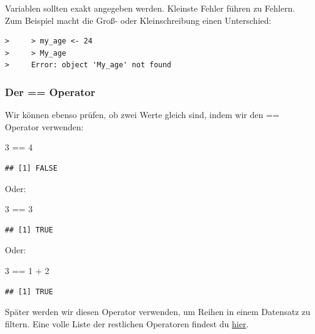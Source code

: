 \documentclass[
]{book}
\newenvironment{Shaded}{\begin{snugshade}}{\end{snugshade}}
\newcommand{\DecValTok}[1]{\textcolor[rgb]{0.00,0.00,0.81}{#1}}
\newcommand{\SpecialCharTok}[1]{\textcolor[rgb]{0.00,0.00,0.00}{#1}}
\begin{document}
Variablen sollten exakt angegeben werden. Kleinste Fehler führen zu Fehlern. Zum Beispiel macht die Groß- oder Kleinschreibung einen Unterschied:

\begin{verbatim}
>     > my_age <- 24
>     > My_age
>     Error: object 'My_age' not found
\end{verbatim}

\hypertarget{der-operator}{%
\subsubsection{Der == Operator}\label{der-operator}}

Wir können ebenso prüfen, ob zwei Werte gleich sind, indem wir den == Operator verwenden:

\begin{Shaded}
\begin{Highlighting}[]
\DecValTok{3} \SpecialCharTok{==} \DecValTok{4}
\end{Highlighting}
\end{Shaded}

\begin{verbatim}
## [1] FALSE
\end{verbatim}

Oder:

\begin{Shaded}
\begin{Highlighting}[]
\DecValTok{3} \SpecialCharTok{==} \DecValTok{3}
\end{Highlighting}
\end{Shaded}

\begin{verbatim}
## [1] TRUE
\end{verbatim}

Oder:

\begin{Shaded}
\begin{Highlighting}[]
\DecValTok{3} \SpecialCharTok{==} \DecValTok{1} \SpecialCharTok{+} \DecValTok{2}
\end{Highlighting}
\end{Shaded}

\begin{verbatim}
## [1] TRUE
\end{verbatim}

Später werden wir diesen Operator verwenden, um Reihen in einem Datensatz zu filtern. Eine volle Liste der restlichen Operatoren findest du \href{https://www.statmethods.net/management/operators.html}{hier}.
\end{document}
